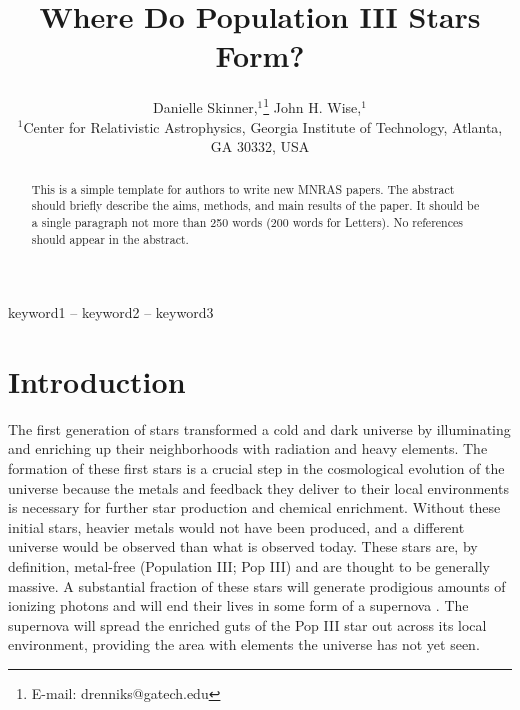 \documentclass[a4paper,fleqn,usenatbib]{mnras}
\title[Where Do Pop III Stars Form?]{Where Do Population III Stars Form?}
\author[Danielle Skinner et al.]{
Danielle Skinner,$^{1}$\thanks{E-mail: drenniks@gatech.edu}
John H. Wise,$^{1}$
\\
$^{1}$Center for Relativistic Astrophysics, Georgia Institute of Technology, 
Atlanta, GA 30332, USA\\
}
\begin{document}
\label{firstpage}
\pagerange{\pageref{firstpage}--\pageref{lastpage}}
\maketitle

\begin{abstract}
This is a simple template for authors to write new MNRAS papers.
The abstract should briefly describe the aims, methods, and main results of the 
paper.
It should be a single paragraph not more than 250 words (200 words for Letters).
No references should appear in the abstract.
\end{abstract}

\begin{keywords}
keyword1 -- keyword2 -- keyword3
\end{keywords}


\section{Introduction}

The first generation of stars transformed a cold and dark universe
by illuminating and enriching up their neighborhoods with radiation
and heavy elements. The formation of these first stars is a crucial step in the cosmological evolution of the universe because the metals and feedback they deliver to their local environments is necessary for further star production and chemical enrichment. Without these initial stars, heavier metals would not have been produced, and a different universe would be observed than what is observed today. These stars are, by definition, metal-free (Population III; Pop III) and are thought to be generally massive. A substantial fraction of these stars will generate prodigious amounts of ionizing photons and will end their lives in some form of a supernova \citep[e.g.][]{Schaerer02, Heger02}. The supernova will spread the enriched guts of the Pop III star out across its local environment, providing the area with elements the universe has not yet seen. 
\end{document}
